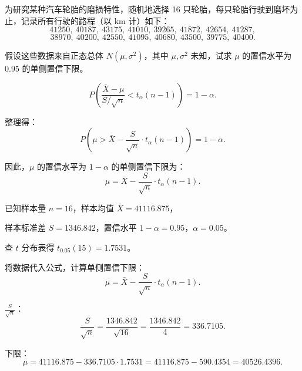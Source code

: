 \documentclass[twoside]{article}
\begin{document}
为研究某种汽车轮胎的磨损特性，随机地选择 16 只轮胎，每只轮胎行驶到磨坏为止，记录所有行驶的路程（以 km 计）如下：
\[
41250, \ 40187, \ 43175, \ 41010, \ 39265, \ 41872, \ 42654, \ 41287,
\]
\[
38970, \ 40200, \ 42550, \ 41095, \ 40680, \ 43500, \ 39775, \ 40400.
\]

假设这些数据来自正态总体 $N(\mu, \sigma^2)$，其中 $\mu, \sigma^2$ 未知，试求 $\mu$ 的置信水平为 $0.95$ 的单侧置信下限。

\begin{ans}{26}{26}

        \[
        P\left( \frac{\bar{X} - \mu}{S / \sqrt{n}} < t_\alpha(n-1) \right) = 1 - \alpha.
        \]
        
        整理得：
        \[
        P\left( \mu > \bar{X} - \frac{S}{\sqrt{n}} \cdot t_\alpha(n-1) \right) = 1 - \alpha.
        \]
        
        因此，$\mu$ 的置信水平为 $1-\alpha$ 的单侧置信下限为：
        \[
        \mu = \bar{X} - \frac{S}{\sqrt{n}} \cdot t_\alpha(n-1).
        \]
        
        已知样本量 $n=16$，样本均值 $\bar{X} = 41116.875$，
        
        样本标准差 $S = 1346.842$，置信水平 $1-\alpha = 0.95$，$\alpha = 0.05$。
        
        查 $t$ 分布表得 $t_{0.05}(15) = 1.7531$。
        
        将数据代入公式，计算单侧置信下限：
        \[
        \mu = \bar{X} - \frac{S}{\sqrt{n}} \cdot t_\alpha(n-1).
        \]
        
        $\frac{S}{\sqrt{n}}$：
        \[
        \frac{S}{\sqrt{n}} = \frac{1346.842}{\sqrt{16}} = \frac{1346.842}{4} = 336.7105.
        \]
        
        下限：
        \[
        \mu = 41116.875 - 336.7105 \cdot 1.7531 = 41116.875 - 590.4354 = 40526.4396.
        \]
\end{ans}
\end{document}
